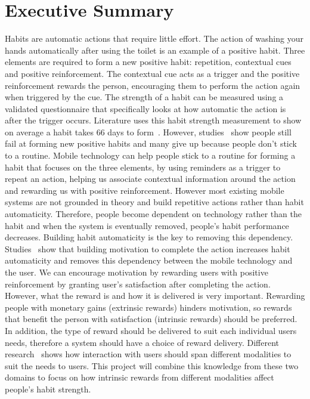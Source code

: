 \section*{Executive Summary}
Habits are automatic actions that require little effort. The action of washing your hands automatically after using the toilet is an example of a positive habit. Three elements are required to form a new positive habit: repetition, contextual cues and positive reinforcement. The contextual cue acts as a trigger and the positive reinforcement rewards the person, encouraging them to perform the action again when triggered by the cue. The strength of a habit can be measured using a validated questionnaire that specifically looks at how automatic the action is after the trigger occurs. Literature uses this habit strength measurement to show on average a habit takes 66 days to form~\cite{article_how_habits_formed_modelling_habit_formation}. However, studies~\cite{article_promoting_habit_formation, article_the_habitual_consumer} show people still fail at forming new positive habits and many give up because people don't stick to a routine.\newline
\newline
Mobile technology can help people stick to a routine for forming a habit that focuses on the three elements, by using reminders as a trigger to repeat an action, helping us associate contextual information around the action and rewarding us with positive reinforcement. However most existing mobile systems are not grounded in theory and build repetitive actions rather than habit automaticity. Therefore, people become dependent on technology rather than the habit and when the system is eventually removed, people's habit performance decreases.\newline
\newline
Building habit automaticity is the key to removing this dependency. Studies~\cite{article_a_self_efficacy, article_meta_analytic_review_intrinsic_motivation} show that building motivation to complete the action increases habit automaticity and removes this dependency between the mobile technology and the user. We can encourage motivation by rewarding users with positive reinforcement by granting user's satisfaction after completing the action. However, what the reward is and how it is delivered is very important. Rewarding people with monetary gains (extrinsic rewards) hinders motivation, so rewards that benefit the person with satisfaction (intrinsic rewards) should be preferred. In addition, the type of reward should be delivered to suit each individual users needs, therefore a system should have a choice of reward delivery. Different research~\cite{article_user_centred_multimodal_reminders} shows how interaction with users should span different modalities to suit the needs to users. This project will combine this knowledge from these two domains to focus on how intrinsic rewards from different modalities affect people's habit strength.\newline
